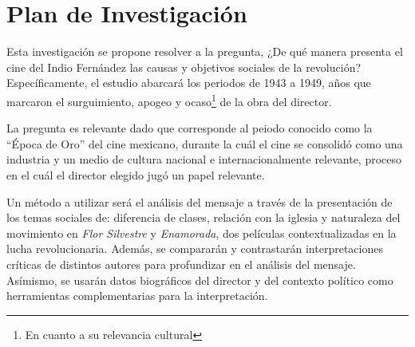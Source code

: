 \section{Plan de Investigación}
Esta investigación se propone resolver a la pregunta,
¿De qué manera presenta el cine del Indio Fernández las causas y objetivos sociales de la revolución? Específicamente, el estudio abarcará los periodos de 1943 a 1949, años que marcaron el surguimiento, apogeo y ocaso\footnote{En cuanto a su relevancia cultural} de la obra del director\autocite[133]{mora_mexican_1978-2}.

La pregunta es relevante dado que corresponde al peiodo conocido como la ``Época de Oro'' del cine mexicano, durante la cuál el cine se consolidó como una industria y un medio de cultura nacional e internacionalmente relevante, proceso en el cuál el director elegido jugó un papel relevante\autocite[133]{mora_mexican_1978-2}.

Un método a utilizar será el análisis del mensaje a través de la presentación de los temas sociales de: diferencia de clases, relación con la iglesia y naturaleza del movimiento en \emph{Flor Silvestre} y  \emph{Enamorada}, dos películas contextualizadas en la lucha revolucionaria. Además, se compararán y contrastarán interpretaciones críticas de distintos autores para profundizar en el análisis del mensaje.  Asímismo, se usarán datos biográficos del director y del contexto político como herramientas complementarias para la interpretación. 

\pagebreak
